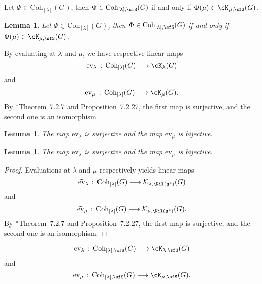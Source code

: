 \documentclass[12pt,a4paper]{amsart}
\newcommand{\BN}{{\mathbb {N}}}
\newcommand{\CK}{{\mathcal {K}}}
\newcommand{\g}{\mathfrak g}
\newcommand{\la}{\langle}
\newcommand{\ra}{\rangle}
\numberwithin{equation}{section}
\newtheorem{lem}[thm]{Lemma}
\theoremstyle{remark}
\def\hha{{}^a\fhh}
\def\Coh{\mathrm{Coh}}
\newcommand{\Grt}{\cK}
\begin{document}



 Let $\Phi\in   \Coh_{[\lambda]}(G)$, then $\Phi\in  \Coh_{[\lambda], \sfS}(G)$  if and only if $\Phi(\mu)\in \Grt_{\mu, \sfS}(G)$.

 \begin{lem}
  Let $\Phi\in   \Coh_{[\lambda]}(G)$, then $\Phi\in  \Coh_{[\lambda], \sfS}(G)$  if and only if $\Phi(\mu)\in \Grt_{\mu, \sfS}(G)$.
    \end{lem}

  By evaluating at $\lambda$ and $\mu$, we have  respective linear maps
   \[
    \mathrm{ev}_{\lambda } \, :\,  \Coh_{[\lambda]}(G) \longrightarrow \Grt_{\lambda}(G)
  \]
  and
    \[
    \mathrm{ev}_{\mu } \, :\,  \Coh_{[\lambda]}(G) \longrightarrow \Grt_{\mu}(G).
  \]
  By \cite{Vg}*{Theorem~7.2.7 and Proposition~7.2.27}, the first  map   is surjective, and the second one is an isomorphism.

    \begin{lem}
     The map $\mathrm{ev}_{\lambda } $ is surjective and the map $\mathrm{ev}_{\mu}$ is bijective.
  \end{lem}



  \begin{lem}
     The map $\mathrm{ev}_{\lambda } $ is surjective and the map $\mathrm{ev}_{\mu}$ is bijective.
  \end{lem}
  \begin{proof}
Evaluations at $\lambda$ and $\mu$ respectively yields linear maps
   \[
    \widetilde{\mathrm{ev}}_{\lambda } \, :\,  \Coh_{[\lambda]}(G) \longrightarrow \CK_{\lambda,\Nil(\g^*)}(G)
      \]
  and
    \[
   \widetilde{ \mathrm{ev}}_{\mu } \, :\,  \Coh_{[\lambda]}(G) \longrightarrow \CK_{\mu,\Nil(\g^*)}(G).
  \]
By \cite{Vg}*{Theorem~7.2.7 and Proposition~7.2.27}, the first  map   is surjective, and the second one is an isomorphism.
\end{proof}
 \[
    \mathrm{ev}_{\lambda } \, :\,  \Coh_{[\lambda],\sfS}(G) \longrightarrow \Grt_{\lambda,\sfS}(G)
  \]
  and
    \[
    \mathrm{ev}_{\mu } \, :\,  \Coh_{[\lambda],\sfS}(G) \longrightarrow \Grt_{\mu,\sfS}(G).
  \]
\end{document}
